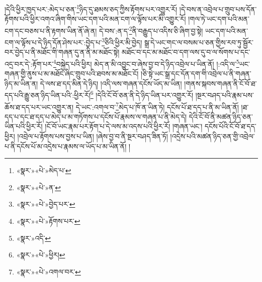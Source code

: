 །དེའི་ཕྱིར་ཁྱད་པར་:མེད་པ་ཅན་\footnote{«སྣར་»«པེ་»མེད་པ་}ཉིད་དུ་ཐམས་ཅད་ཀྱིས་རྟོགས་པར་འགྱུར་རོ། །དེ་བས་ན་འབྲེལ་པ་གྲུབ་པས་དོན་རྟོགས་པའི་ཕྱིར་འགའ་ཞིག་གིས་ཡང་དག་པའི་མན་ངག་ལ་ལྟོས་པར་མི་འགྱུར་རོ། །གལ་ཏེ་ཡང་དག་པའི་མན་ངག་དང་བཅས་པ་ནི་རྟགས་ཡིན་ནོ་ཞེ་ན། དེ་བས་:ན་ད་\footnote{«སྣར་»«པེ་»ན་}ནི་བརྒྱུད་པ་འདིས་ཅི་ཞིག་བྱ་སྟེ། ཡང་དག་པའི་མན་ངག་ལ་ལྟོས་པ་དེ་ཉིད་དོན་ཤེས་པར་:བྱེད་པ་\footnote{«སྣར་»«པེ་»བྱེད་པར་}ཅིའི་ཕྱིར་མི་བྱེད། སྒྲ་དེ་ཡང་གང་ལ་བསམ་པ་ཅན་གྱིས་རབ་ཏུ་སྦྱོར་བར་བྱེད་པ་ནི་མཐོང་གི་གཞན་དུ་ན་ནི་མ་མཐོང་སྟེ། མཐོང་བ་དང་མ་མཐོང་བ་དག་ལས་དུ་བ་ལ་སོགས་པ་དང་འདྲ་བར་དེ་:རྟོག་པར་\footnote{«སྣར་»«པེ་»རྟོགས་པར་}བསྐྱེད་པའི་ཕྱིར། མེད་ན་མི་འབྱུང་བ་ཞེས་བྱ་བ་དེ་ཉིད་འབྲེལ་པ་ཡིན་ནོ། །:འདི་ལ་\footnote{«སྣར་»འདི་}ཡང་གཞན་གྱི་ནུས་པ་མ་མཐོང་ཞིང་གྲུབ་པའི་ཐབས་མ་མཐོང་ངོ། །ཅི་སྟེ་ཡང་སྒྲ་དང་དོན་དག་གི་འབྲེལ་པ་ནི་གཞན་ཉིད་མ་ཡིན་ན། དེ་ལས་ཐ་དད་མིན་དེ་ཉིད། །འདི་ལས་གཞན་དངོས་ཡོད་མ་ཡིན། །གནས་སྐབས་གཞན་ནི་ངོ་བོ་ཐ་དད་པའི་རྒྱུ་ཅན་ཉིད་ཡིན་པའི་:ཕྱིར་རོ།\footnote{«སྣར་»«པེ་»ཕྱིར།} །དེའི་ངོ་བོ་ཅན་ནི་དེ་ཉིད་ཡིན་པར་འགྱུར་རོ། །སྔར་བཤད་པའི་རྣམ་པས་ཆོས་ཐ་དད་པར་ཡང་འགྱུར་ན། དེ་ཡང་:འགལ་བ་\footnote{«སྣར་»«པེ་»འགལ་བར་}མེད་པ་ཁོ་ན་ཡིན་ཏེ། དངོས་པོ་ཐ་དད་པ་ནི་མ་ཡིན་ནོ། །ཐ་དད་པ་དང་ཐ་དད་པ་མེད་པ་མ་གཏོགས་པ་དངོས་པོ་རྣམས་ལ་གཞན་པ་ནི་མེད་དེ། དེའི་ངོ་བོ་ནི་མཚན་ཉིད་ཅན་ཡིན་པའི་ཕྱིར་རོ། །ངོ་བོ་ཡང་རྣམ་པར་རྟོག་པ་དེ་ལས་མ་འདས་པའི་ཕྱིར་རོ། །གཞན་ཡང་། དངོས་པོའི་ངོ་བོ་ཐ་དད་ཕྱིར། །འབྲེལ་པ་རྟོགས་པས་བྱས་པ་ཡིན། །ཞེས་བྱ་བ་ནི་སྔར་བཤད་ཟིན་ཏོ། །འདྲེས་པའི་མཚན་ཉིད་ཅན་གྱི་འབྲེལ་པ་ནི་དངོས་པོ་མ་འདྲེས་པ་རྣམས་ལ་ཡོད་པ་མ་ཡིན་ནོ། །
